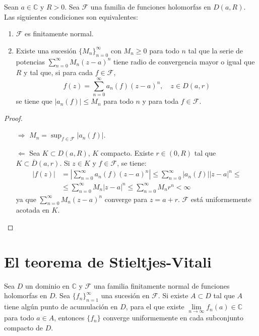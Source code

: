 \begin{theorem}
    Sean $a \in \mathbb{C}$ y $R > 0$.
    Sea $\mathcal{F}$ una familia de funciones holomorfas en $D(a, R)$.
    Las siguientes condiciones son equivalentes:
    \begin{enumerate}
        \item $\mathcal{F}$ es finitamente normal.
        \item Existe una sucesión $\{M_n\}_{n=0}^\infty$ con $M_n \geq 0$ para todo $n$ tal que la serie de potencias $\sum_{n=0}^\infty M_n(z-a)^n$ tiene radio de convergencia mayor o igual que $R$ y tal que, si para cada $f \in \mathcal{F}$,
              $$f(z) = \sum_{n=0}^\infty a_n(f)(z-a)^n, \quad z \in D(a, r)$$
              se tiene que $|a_n(f)| \leq M_n$ para todo $n$ y para toda $f \in \mathcal{F}$.
    \end{enumerate}
\end{theorem}

\begin{proof}
    \hfill
    \begin{itemize}
        \item[$\Rightarrow$] $M_n = \sup_{f \in \mathcal{F}} |a_n(f)|$.
        \item[$\Leftarrow$] Sea $K \subset D(a, R)$, $K$ compacto.
            Existe $r \in (0, R)$ tal que $K \subset \overline{D}(a, r)$.
            Si $z \in K$ y $f \in \mathcal{F}$, se tiene:
            \begin{align*}
                |f(z)| & = \left|\sum_{n=0}^\infty a_n(f)(z-a)^n\right| \leq \sum_{n=0}^\infty |a_n(f)||z-a|^n \leq \\
                       & \leq \sum_{n=0}^\infty M_n|z-a|^n \leq \sum_{n=0}^\infty M_nr^n < \infty
            \end{align*}
            ya que $\sum_{n=0}^\infty M_n(z-a)^n$ converge para $z = a+r$.
            $\mathcal{F}$ está uniformemente acotada en $K$.
    \end{itemize}
\end{proof}

\section{El teorema de Stieltjes-Vitali}
\begin{theorem}
    Sea $D$ un dominio en $\mathbb{C}$ y $\mathcal{F}$ una familia finitamente normal de funciones holomorfas en $D$.
    Sea $\{f_n\}_{n=1}^\infty$ una sucesión en $\mathcal{F}$.
    Si existe $A \subset D$ tal que $A$ tiene algún punto de acumulación en $D$, para el que existe $\lim\limits_{n \to \infty} f_n(a) \in \mathbb{C}$ para todo $a \in A$, entonces $\{f_n\}$ converge uniformemente en cada subconjunto compacto de $D$.
\end{theorem}

